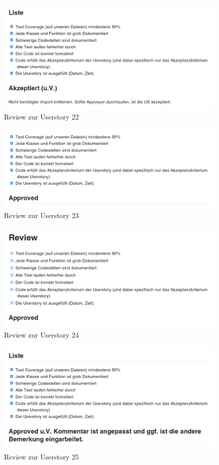 \documentclass[accentcolor=tud9c,12pt,paper=a4]{tudreport}
\begin{document}
\begin{figure}[H]
\centering
\includegraphics[width=.8\textwidth]{code_review/us22}
\caption{Review zur Userstory 22}
\end{figure}

\begin{figure}[H]
\centering
\includegraphics[width=.8\textwidth]{code_review/us23}
\caption{Review zur Userstory 23}
\end{figure}

\begin{figure}[H]
\centering
\includegraphics[width=.8\textwidth]{code_review/us24}
\caption{Review zur Userstory 24}
\end{figure}

\begin{figure}[H]
\centering
\includegraphics[width=.8\textwidth]{code_review/us25}
\caption{Review zur Userstory 25}
\end{figure}
\end{document}
